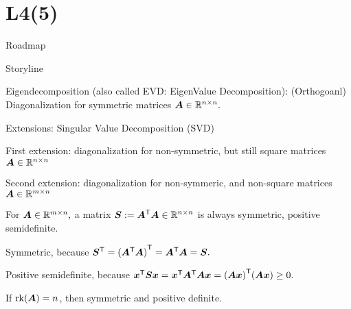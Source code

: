 \documentclass[handout,fleqn,aspectratio=169]{beamer}
\begin{document}
\section{L4(5)}
\begin{frame}{Roadmap}

\plitemsep 0.1in

\bce[(1)] 
\item {}

\item {}

\item {}

\item {}

\item {}

\item {}

\ece
\end{frame}

\begin{frame}{Storyline}

\plitemsep 0.1in

\bci 
\item Eigendecomposition (also called EVD: EigenValue Decomposition): (Orthogoanl) Diagonalization for symmetric matrices $\bm{A} \in {\mathbb R}^{n \times n}.$


\item Extensions: Singular Value Decomposition (SVD)
\bce
\item First extension: diagonalization for non-symmetric, but still square matrices $\bm{A} \in {\mathbb R}^{n \times n}$
\item Second extension: diagonalization for non-symmeric, and non-square matrices $\bm{A} \in {\mathbb R}^{m \times n}$
\ece

\medskip
\item {} For $\bm{A} \in {\mathbb R}^{m \times n},$ a matrix $\bm{S} := {\bm{A}}^{\mathsf{T}} \bm{A} \in {\mathbb R}^{n \times n}$ is always symmetric, positive semidefinite. 
\bci
\item Symmetric, because ${\bm{S}}^{\mathsf{T}} = {({\bm{A}}^{\mathsf{T}} \bm{A})}^{\mathsf{T}} = {\bm{A}}^{\mathsf{T}} \bm{A} = \bm{S}.$
\item Positive semidefinite, because ${\bm{x}}^{\mathsf{T}} \bm{S} \bm{x} = {\bm{x}}^{\mathsf{T}} {\bm{A}}^{\mathsf{T}}\bm{A} \bm{x} = {(\bm{A} \bm{x})}^{\mathsf{T}} (\bm{A} \bm{x}) \ge 0.$

\item If $\text{rk}(\bm{A}) = n$, then symmetric and positive definite. 
\eci

\eci
\end{frame}
\end{document}
